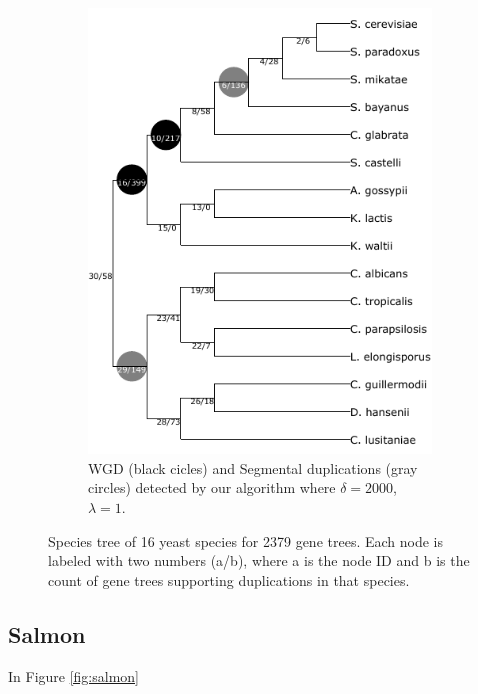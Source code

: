 \documentclass[10pt]{article}
\begin{document}
\begin{figure}[h!]
\begin{subfigure}[b]{0.48\textwidth}
        \includegraphics[scale=0.7]{figs/fungi_greedy2000.pdf} %
        \caption{WGD (black cicles) and Segmental duplications (gray circles) detected by our algorithm where $\delta=2000$, $\lambda=1$.}
        \label{fig:fungi-greedy}
    \end{subfigure}
    
    \caption{
        Species tree of 16 yeast species for 2379 gene trees. Each node is labeled with two numbers (a/b), where a is the node ID and b is the count of gene trees supporting duplications in that species.
    }
    \label{fig:fungi}
\end{figure}


\subsection{Salmon}
In Figure \ref{fig:salmon}
\end{document}
